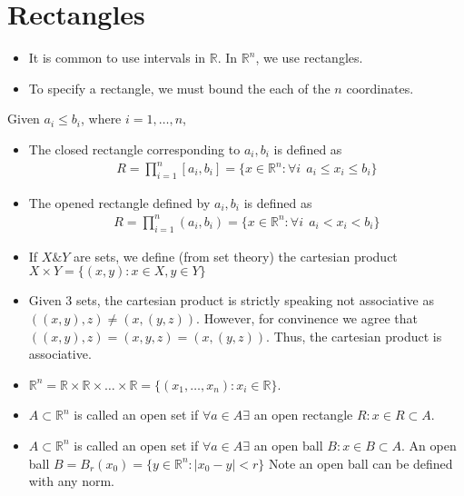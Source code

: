 \documentclass[a4paper]{article}
\numberwithin{equation}{section}
\newcommand{\R}{\mathbb{R}}
\begin{document}
\section{Rectangles}
\begin{itemize}
    \item It is common to use intervals in $\R$. In $\R^n$, we use rectangles. 
    \item To specify a rectangle, we must bound the each of the $n$ coordinates.
\end{itemize}
\begin{definition}
    Given $a_i\leq b_i$, where $i=1,\dots, n$,
    \begin{itemize}
        \item The closed rectangle corresponding to $a_i,b_i$ is defined as
        \begin{align}
            R=\prod_{i=1}^n[a_i,b_i]=\{x\in\R^n:\forall i\:\: a_i\leq x_i\leq b_i\}
        \end{align}
        \item The opened rectangle defined by $a_i,b_i$ is defined as 
        \begin{align}
            R=\prod_{i=1}^n(a_i,b_i)=\{x\in\R^n:\forall i\:\: a_i<x_i<b_i\}
        \end{align}
    \end{itemize}
\end{definition}
\begin{itemize}
    \item If $X\&Y$ are sets, we define (from set theory) the cartesian product $X\times Y=\{(x,y): x\in X,y\in Y\}$
    \item Given 3 sets, the cartesian product is strictly speaking not associative as $((x,y),z)\neq(x,(y,z))$. However, for convinence we agree that $((x,y),z)=(x,y,z)=(x,(y,z))$. Thus, the cartesian product is associative.
    \item $\R^n=\R\times\R\times\dots\times\R=\{(x_1,\dots,x_n):x_i\in\R\}$.
\end{itemize}
\begin{definition}
    \begin{itemize}
        \item $A\subset\R^n$ is called an open set if $\forall a\in A\exists$ an open rectangle $R: x\in R\subset A$.
        \item $A\subset\R^n$ is called an open set if $\forall a\in A\exists$ an open ball $B: x\in B\subset A$. An open ball $B=B_r(x_0)=\{y\in\R^n:|x_0-y|<r\}$ Note an open ball can be defined with any norm.
    \end{itemize}
\end{definition}
\end{document}
